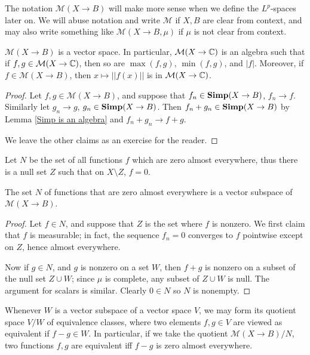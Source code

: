 \begin{subsec}
The notation $\mathcal M(X \to B)$ will make more sense when we define the $L^p$-spaces later on.
We will abuse notation and write $\mathcal M$ if $X,B$ are clear from context, and may also write something like $\mathcal M(X \to B, \mu)$ if $\mu$ is not clear from context.
\end{subsec}

\begin{lemma}
$\mathcal M(X \to B)$ is a vector space.
In particular, $\mathcal M(X \to \mathbb{C})$ is an algebra such that if $f, g \in \mathcal M(X \to \mathbb{C})$, then so are $\max(f,g)$, $\min(f,g)$, and $|f|$.
Moreover, if $f \in \mathcal M(X \to B)$, then $x \mapsto ||f(x)||$ is in $\mathcal M(X \to \mathbb{C})$.
\end{lemma}
\begin{proof}
Let $f,g \in \mathcal M(X \to B)$, and suppose that $f_n \in \mathbf{Simp}(X \to B)$, $f_n \to f$. Similarly let $g_n \to g$, $g_n \in \mathbf{Simp}(X \to B)$.
Then $f_n + g_n \in \mathbf{Simp}(X \to B)$ by Lemma \ref{Simp is an algebra} and $f_n + g_n \to f + g$.

We leave the other claims as an exercise for the reader.
\end{proof}

\begin{subsec}
Let $N$ be the set of all functions $f$ which are zero almost everywhere, thus there is a null set $Z$ such that on $X \setminus Z$, $f = 0$.
\end{subsec}

\begin{lemma}
The set $N$ of functions that are zero almost everywhere is a vector subspace of $\mathcal M(X \to B)$.
\end{lemma}
\begin{proof}
Let $f \in N$, and suppose that $Z$ is the set where $f$ is nonzero.
We first claim that $f$ is measurable; in fact, the sequence $f_n = 0$ converges to $f$ pointwise except on $Z$, hence almost everywhere.

Now if $g \in N$, and $g$ is nonzero on a set $W$, then $f + g$ is nonzero on a subset of the null set $Z \cup W$; since $\mu$ is complete, any subset of $Z \cup W$ is null. The argument for scalars is similar. Clearly $0 \in N$ so $N$ is nonempty.
\end{proof}

\begin{subsec}
Whenever $W$ is a vector subspace of a vector space $V$, we may form its quotient space $V/W$ of equivalence classes, where two elements $f, g \in V$ are viewed as equivalent if $f - g \in W$.
In particular, if we take the quotient $\mathcal M(X \to B)/N$, two functions $f,g$ are equivalent iff $f - g$ is zero almost everywhere.
\end{subsec}

